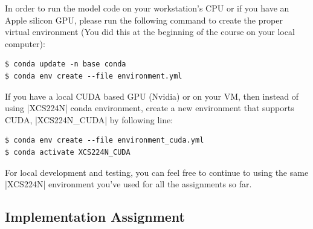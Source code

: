 In order to run the model code on your workstation's CPU or if you have an Apple silicon GPU, please run the following command to create the proper virtual environment (You did this at the beginning of the course on your local computer):

\begin{lstlisting}
$ conda update -n base conda
$ conda env create --file environment.yml
\end{lstlisting}

If you have a local CUDA based GPU (Nvidia) or on your VM, then instead of using |XCS224N| conda environment, create a new environment that supports CUDA, |XCS224N_CUDA| by following line:

\begin{lstlisting}
$ conda env create --file environment_cuda.yml
$ conda activate XCS224N_CUDA
\end{lstlisting}

For local development and testing, you can feel free to continue to using the same |XCS224N| environment you've used for all the assignments so far.

\subsection*{Implementation Assignment}

